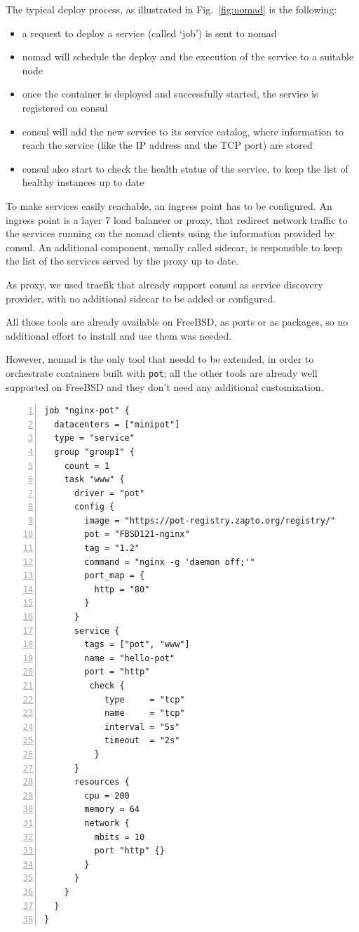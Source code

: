 \documentclass[conference,a4paper,11pt]{IEEEtran}
\begin{document}
The typical deploy process, as illustrated in Fig.~\ref{fig:nomad} is the following:
\begin{itemize}
	\item a request to deploy a service (called ‘job’) is sent to nomad
	\item nomad will schedule the deploy and the execution of the service to a suitable node
	\item once the container is deployed and successfully started, the service is registered on consul
	\item consul will add the new service to its service catalog, where information to reach the service (like the IP address and the TCP port) are stored
	\item consul also start to check the health status of the service, to keep the list of healthy instances up to date
\end{itemize}

To make services easily reachable, an ingress point has to be configured. An ingress point is a layer 7 load balancer or proxy, that redirect network traffic to the services running on the nomad clients using the information provided by consul. An additional component, usually called sidecar, is responsible to keep the list of the services served by the proxy up to date.

As proxy, we used traefik that already support consul as service discovery provider, with no additional sidecar to be added or configured.

All those tools are already available on FreeBSD, as ports or as packages, so no additional effort to install and use them was needed.

However, nomad is the only tool that needd to be extended, in order to orchestrate containers built with \texttt{pot}; all the other tools are already well supported on FreeBSD and they don’t need any additional customization.

\begin{lstlisting}[float=*, backgroundcolor=\color{listing-bg},numbers=left,label=list:nomad,caption={An example of a nomad job}]
job "nginx-pot" {
  datacenters = ["minipot"]
  type = "service"
  group "group1" {
    count = 1 
    task "www" {
      driver = "pot"
      config {
        image = "https://pot-registry.zapto.org/registry/"
        pot = "FBSD121-nginx"
        tag = "1.2"
        command = "nginx -g 'daemon off;'"
        port_map = {
          http = "80"
        }
      }
      service {
        tags = ["pot", "www"]
        name = "hello-pot"
        port = "http"
         check {
            type     = "tcp"
            name     = "tcp"
            interval = "5s"
            timeout  = "2s"
          }
      }
      resources {
        cpu = 200
        memory = 64
        network {
          mbits = 10
          port "http" {}
        }
      }
    }
  }
}
\end{lstlisting}
\end{document}
